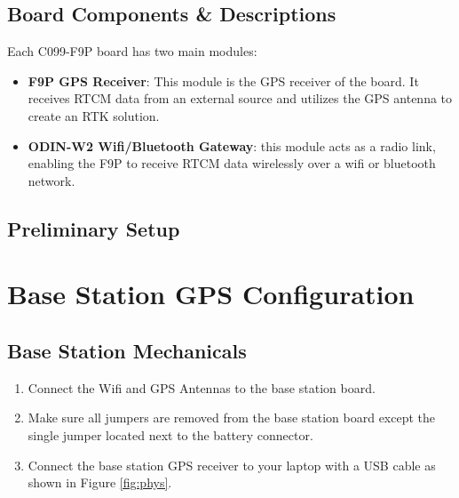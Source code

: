 \documentclass{article}%
\begin{document}
\subsection{Board Components \& Descriptions}
	Each C099-F9P board has two main modules:
	\begin{itemize}
		\item \textbf{F9P GPS Receiver}: This module is the GPS receiver of the board.  It receives RTCM data from an external source and utilizes the GPS antenna to create an RTK solution.
		\item \textbf{ODIN-W2 Wifi/Bluetooth Gateway}: this module acts as a radio link, enabling the F9P to receive RTCM data wirelessly over a wifi or bluetooth network.
	\end{itemize}

\subsection{Preliminary Setup}\label{ref:down_config}

\section{Base Station GPS Configuration}
\subsection{Base Station Mechanicals}
	\begin{enumerate}
		\item Connect the Wifi and GPS Antennas to the base station board.
		\item Make sure all jumpers are removed from the base station board except the single jumper located next to the battery connector.
		\item Connect the base station GPS receiver to your laptop with a USB cable as shown in Figure \ref{fig:phys}.
	\end{enumerate}
	
\end{document}
